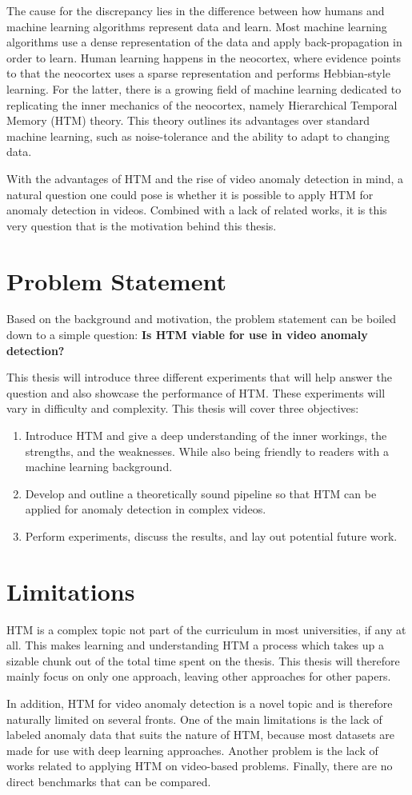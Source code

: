 The cause for the discrepancy lies in the difference between how humans and machine learning algorithms represent data and learn. Most machine learning algorithms use a dense representation of the data and apply back-propagation in order to learn. Human learning happens in the neocortex, where evidence points to that the neocortex uses a sparse representation and performs Hebbian-style learning. For the latter, there is a growing field of machine learning dedicated to replicating the inner mechanics of the neocortex, namely Hierarchical Temporal Memory (HTM) theory. This theory outlines its advantages over standard machine learning, such as noise-tolerance and the ability to adapt to changing data.
\par
With the advantages of HTM and the rise of video anomaly detection in mind, a natural question one could pose is whether it is possible to apply HTM for anomaly detection in videos. Combined with a lack of related works, it is this very question that is the motivation behind this thesis.
\section{Problem Statement}
Based on the background and motivation, the problem statement can be boiled down to a simple question: \textbf{Is HTM viable for use in video anomaly detection?}\par
This thesis will introduce three different experiments that will help answer the question and also showcase the performance of HTM. These experiments will vary in difficulty and complexity. This thesis will cover three objectives:
\begin{enumerate}
    \item Introduce HTM and give a deep understanding of the inner workings, the strengths, and the weaknesses. While also being friendly to readers with a machine learning background.
    \item Develop and outline a theoretically sound pipeline so that HTM can be applied for anomaly detection in complex videos.
    \item Perform experiments, discuss the results, and lay out potential future work.
\end{enumerate}
\section{Limitations}
HTM is a complex topic not part of the curriculum in most universities, if any at all. This makes learning and understanding HTM a process which takes up a sizable chunk out of the total time spent on the thesis. This thesis will  therefore mainly focus on only one approach, leaving other approaches for other papers.\par
In addition, HTM for video anomaly detection is a novel topic and is therefore naturally limited on several fronts. One of the main limitations is the lack of labeled anomaly data that suits the nature of HTM, because most datasets are made for use with deep learning approaches. Another problem is the lack of works related to applying HTM on video-based problems. Finally, there are no direct benchmarks that can be compared.

